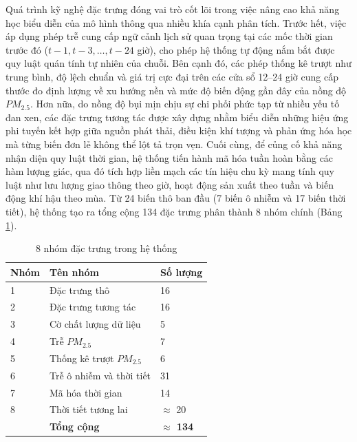 Quá trình kỹ nghệ đặc trưng đóng vai trò cốt lõi trong việc nâng cao khả năng học biểu diễn của mô hình thông qua nhiều khía cạnh phân tích. Trước hết, việc áp dụng phép trễ cung cấp ngữ cảnh lịch sử quan trọng tại các mốc thời gian trước đó ($t-1, t-3, \ldots, t-24$ giờ), cho phép hệ thống tự động nắm bắt được quy luật quán tính tự nhiên của chuỗi. Bên cạnh đó, các phép thống kê trượt như trung bình, độ lệch chuẩn và giá trị cực đại trên các cửa sổ 12--24 giờ cung cấp thước đo định lượng về xu hướng nền và mức độ biến động gần đây của nồng độ $PM_{2.5}$. Hơn nữa, do nồng độ bụi mịn chịu sự chi phối phức tạp từ nhiều yếu tố đan xen, các đặc trưng tương tác được xây dựng nhằm biểu diễn những hiệu ứng phi tuyến kết hợp giữa nguồn phát thải, điều kiện khí tượng và phản ứng hóa học mà từng biến đơn lẻ không thể lột tả trọn vẹn. Cuối cùng, để củng cố khả năng nhận diện quy luật thời gian, hệ thống tiến hành mã hóa tuần hoàn bằng các hàm lượng giác, qua đó tích hợp liền mạch các tín hiệu chu kỳ mang tính quy luật như lưu lượng giao thông theo giờ, hoạt động sản xuất theo tuần và biến động khí hậu theo mùa.
Từ 24 biến thô ban đầu (7 biến ô nhiễm và 17 biến thời tiết), hệ thống tạo ra tổng cộng 134 đặc trưng phân thành 8 nhóm chính (Bảng \ref{tab:8_nhom_dac_trung}).

\begin{table}[H]
    \centering
    \caption{8 nhóm đặc trưng trong hệ thống}
    \label{tab:8_nhom_dac_trung}
    \renewcommand{\arraystretch}{1.3}
    \begin{tabular}{p{1.5cm} p{8.5cm} p{3cm}}
    \toprule
    \textbf{Nhóm} & \textbf{Tên nhóm} & \textbf{Số lượng} \\
    \midrule
    1 & Đặc trưng thô & 16 \\
    2 & Đặc trưng tương tác & 16 \\
    3 & Cờ chất lượng dữ liệu & 5 \\
    4 & Trễ $PM_{2.5}$ & 7 \\
    5 & Thống kê trượt $PM_{2.5}$ & 6 \\
    6 & Trễ ô nhiễm và thời tiết & 31 \\
    7 & Mã hóa thời gian & 14 \\
    8 & Thời tiết tương lai & $\approx$ 20 \\
    \midrule
    & \textbf{Tổng cộng} & \textbf{$\approx$ 134} \\
    \bottomrule
    \end{tabular}
\end{table}


